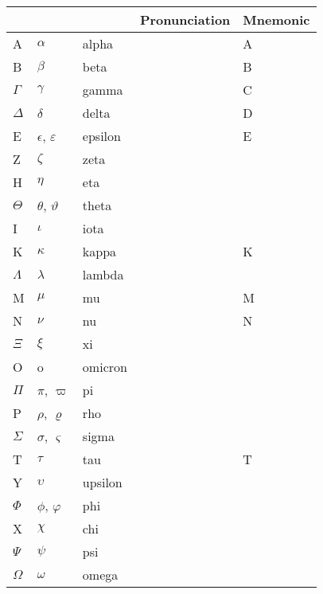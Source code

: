 \documentclass{article}
\begin{document}
\begin{tabular}{| l | l | l | l | l |}
\hline
  & & & Pronunciation & Mnemonic\\ \hline
A & $\alpha$ & alpha & & A\\ \hline
B & $\beta$ & beta & & B\\ \hline
$\Gamma$ & $\gamma$ & gamma & & C\\ \hline
$\Delta$ & $\delta$ & delta & & D\\ \hline
E & $\epsilon$, $\varepsilon$ & epsilon & & E\\ \hline
Z & $\zeta$ & zeta & & \\ \hline
H & $\eta$ & eta & & \\ \hline
$\Theta$ & $\theta$, $\vartheta$ & theta & & \\ \hline
I & $\iota$ & iota & & \\ \hline
K & $\kappa$ & kappa & & K \\ \hline
$\Lambda$ & $\lambda$ & lambda & & \\ \hline
M & $\mu$ & mu & & M \\ \hline
N & $\nu$ & nu & & N \\ \hline
$\Xi$ & $\xi$ & xi & & \\ \hline
O & o & omicron & & \\ \hline
$\Pi$ & $\pi$, $\varpi$ & pi & & \\ \hline
P & $\rho$, $\varrho$ & rho & & \\ \hline
$\Sigma$ & $\sigma$, $\varsigma$ & sigma & & \\ \hline
T & $\tau$ & tau & & T \\ \hline
Y & $\upsilon$ & upsilon & & \\ \hline
$\Phi$ & $\phi$, $\varphi$ & phi & & \\ \hline
X & $\chi$ & chi & & \\ \hline
$\Psi$ & $\psi$ & psi & & \\ \hline
$\Omega$ & $\omega$ & omega & & \\ \hline
\end{tabular}
\end{document}
